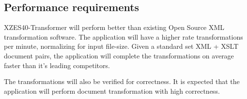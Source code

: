 \subsection{Performance requirements}
%

XZES40-Transformer will perform better than existing Open Source XML transformation software.
The application will have a higher rate transformations per minute, normalizing for input file-size.
Given a standard set XML + XSLT document pairs, the application will complete the transformations on average faster than it's leading competitors.

The transformations will also be verified for correctness.
It is expected that the application will perform document transformation with high correctness.


    
